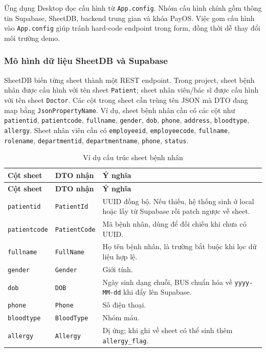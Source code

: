 \documentclass[12pt,a4paper]{article}
\numberwithin{figure}{subsection}
\numberwithin{table}{subsection}
\begin{document}
Ứng dụng Desktop đọc cấu hình từ \texttt{App.config}. Nhóm cấu hình chính gồm thông tin Supabase, SheetDB, backend trung gian và khóa PayOS. Việc gom cấu hình vào \texttt{App.config} giúp tránh hard-code endpoint trong form, đồng thời dễ thay đổi môi trường demo.

\subsubsection{Mô hình dữ liệu SheetDB và Supabase}

SheetDB biến từng sheet thành một REST endpoint. Trong project, sheet bệnh nhân được cấu hình với tên sheet \texttt{Patient}; sheet nhân viên/bác sĩ được cấu hình với tên sheet \texttt{Doctor}. Các cột trong sheet cần trùng tên JSON mà DTO đang map bằng \texttt{JsonPropertyName}. Ví dụ, sheet bệnh nhân cần có các cột như \texttt{patientid}, \texttt{patientcode}, \texttt{fullname}, \texttt{gender}, \texttt{dob}, \texttt{phone}, \texttt{address}, \texttt{bloodtype}, \texttt{allergy}. Sheet nhân viên cần có \texttt{employeeid}, \texttt{employeecode}, \texttt{fullname}, \texttt{rolename}, \texttt{departmentid}, \texttt{departmentname}, \texttt{phone}, \texttt{status}.

\begin{longtable}{|p{3.1cm}|p{3.2cm}|p{7.3cm}|}
\caption{Ví dụ cấu trúc sheet bệnh nhân} \\
\hline
\textbf{Cột sheet} & \textbf{DTO nhận} & \textbf{Ý nghĩa} \\
\hline
\endfirsthead
\hline
\textbf{Cột sheet} & \textbf{DTO nhận} & \textbf{Ý nghĩa} \\
\hline
\endhead
\texttt{patientid} & \texttt{PatientId} & UUID đồng bộ. Nếu thiếu, hệ thống sinh ở local hoặc lấy từ Supabase rồi patch ngược về sheet. \\
\hline
\texttt{patientcode} & \texttt{PatientCode} & Mã bệnh nhân, dùng để đối chiếu khi chưa có UUID. \\
\hline
\texttt{fullname} & \texttt{FullName} & Họ tên bệnh nhân, là trường bắt buộc khi lọc dữ liệu hợp lệ. \\
\hline
\texttt{gender} & \texttt{Gender} & Giới tính. \\
\hline
\texttt{dob} & \texttt{DOB} & Ngày sinh dạng chuỗi, BUS chuẩn hóa về \texttt{yyyy-MM-dd} khi đẩy lên Supabase. \\
\hline
\texttt{phone} & \texttt{Phone} & Số điện thoại. \\
\hline
\texttt{bloodtype} & \texttt{BloodType} & Nhóm máu. \\
\hline
\texttt{allergy} & \texttt{Allergy} & Dị ứng; khi ghi về sheet có thể sinh thêm \texttt{allergy\_flag}. \\
\hline
\end{longtable}
\end{document}
